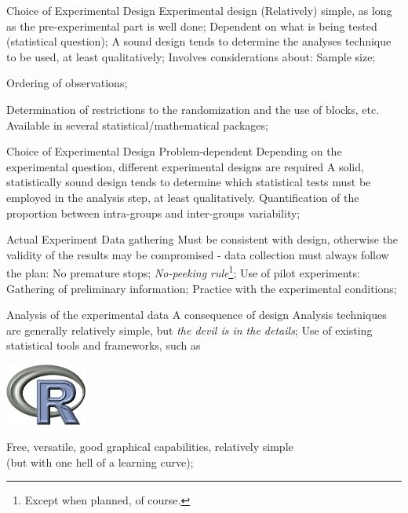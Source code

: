 \documentclass[t]{beamer}
\begin{document}

\begin{ftst}
{Choice of Experimental Design}
{Experimental design}
\bitems (Relatively) simple, as long as the pre-experimental part is well done;
	\spitem Dependent on what is being tested (statistical question);
	\spitem A sound design tends to determine the analyses technique to be used, at least  qualitatively;
	\spitem Involves considerations about:
	\bitems Sample size;
		\item Ordering of observations;
		\item Determination of restrictions to the randomization and the use of blocks, etc.
	\eitem
	\spitem Available in several statistical/mathematical packages;
\eitem
\end{ftst}


\begin{ftst}
{Choice of Experimental Design}
{Problem-dependent}
\bitems Depending on the experimental question, different experimental designs are required
	\spitem A solid, statistically sound design tends to determine which statistical tests must be employed in the analysis step, at least qualitatively.
	\spitem Quantification of the proportion between intra-groups and inter-groups variability;
\eitem
\end{ftst}

\begin{ftst}
{Actual Experiment}
{Data gathering}
\bitems Must be consistent with design, otherwise the validity of the results may be compromised - data collection must always follow the plan:\vhalf
	\bitems No premature stops;	
		\spitem\textit{No-peeking rule}\footnote[1]{Except when planned, of course.};
	\eitem
	\spitem Use of pilot experiments:\vhalf
	\bitems Gathering of preliminary information;
		\spitem Practice with the experimental conditions;
	\eitem
\eitem
\end{ftst}


\begin{ftst}
{Analysis of the experimental data}
{A consequence of design}
\bitems Analysis techniques are generally relatively simple, but \textit{the devil is in the details};
	\spitem Use of existing statistical tools and frameworks, such as
\eitem
\begin{center}
\includegraphics[width=0.2\textwidth]{../figs/rlogo.png}
\end{center}
\bitems Free, versatile, good graphical capabilities, relatively simple\\
(but with one hell of a learning curve);
\eitem
\end{ftst}
\end{document}
